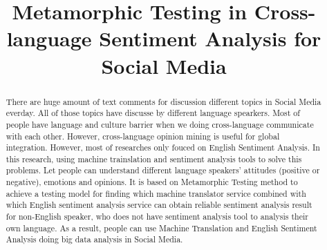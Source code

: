 \documentclass[conference]{IEEEtran}
\begin{document}
\title{\huge Metamorphic Testing in Cross-language Sentiment Analysis for Social Media}

\author{
\and
{}
\and
{}
\and
{}
}

\maketitle

\begin{abstract}
  There are huge amount of text comments for discussion different topics in Social
  Media everday. All of those topics have discusse by different language
  spearkers. Most of people have language and culture barrier when we doing
  cross-language communicate with each other. However, cross-language opinion
  mining is useful for global integration. However, most of researches only fouced on
  English Sentiment Analysis. In this research, using machine
  trainslation and sentiment analysis tools to solve this problems. Let people
  can understand different language speakers' attitudes (positive or negative),
  emotions and opinions. It is based on Metamorphic Testing method to achieve a
  testing model for finding which machine translator service combined with which
  English sentiment analysis service can obtain reliable sentiment analysis
  result for non-English speaker, who does not have sentiment analysis tool to
  analysis their own language. As a result, people can use Machine Translation
  and English Sentiment Analysis doing big data analysis in Social Media.
\end{abstract}
\end{document}
